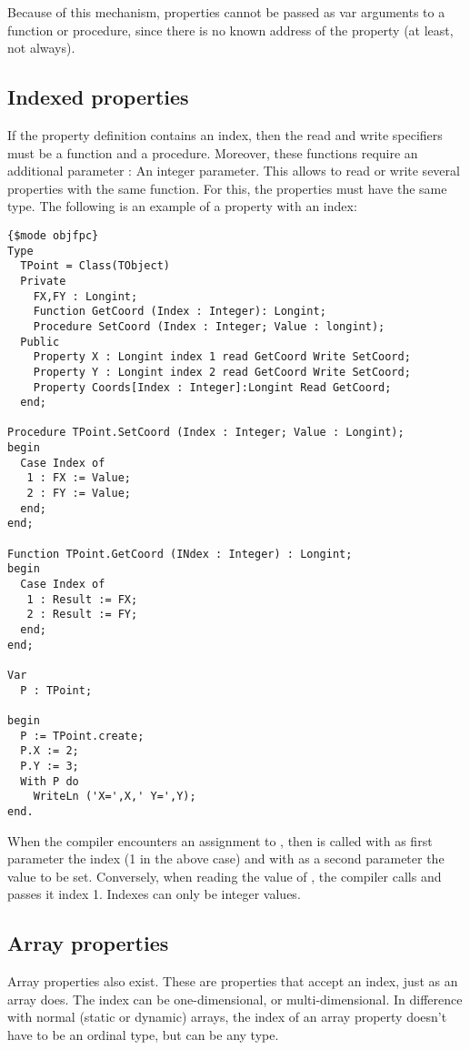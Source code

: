Because of this mechanism, properties cannot be passed as var arguments to a
function or procedure, since there is no known address of the property (at
least, not always).

\subsection{Indexed properties}
If the property definition contains an index,  then the read and write
specifiers must be a function and a procedure. Moreover, these functions
require an additional parameter : An integer parameter. This allows to read
or write several properties with the same function. For this, the properties
must have the same type.
The following is an example of a property with an index:
\begin{verbatim}
{$mode objfpc}
Type 
  TPoint = Class(TObject)
  Private
    FX,FY : Longint;
    Function GetCoord (Index : Integer): Longint;
    Procedure SetCoord (Index : Integer; Value : longint);
  Public
    Property X : Longint index 1 read GetCoord Write SetCoord;
    Property Y : Longint index 2 read GetCoord Write SetCoord;
    Property Coords[Index : Integer]:Longint Read GetCoord;
  end;

Procedure TPoint.SetCoord (Index : Integer; Value : Longint);
begin
  Case Index of
   1 : FX := Value;
   2 : FY := Value;
  end;
end;

Function TPoint.GetCoord (INdex : Integer) : Longint;
begin
  Case Index of
   1 : Result := FX;
   2 : Result := FY;
  end;
end;

Var 
  P : TPoint;

begin
  P := TPoint.create;
  P.X := 2;
  P.Y := 3;
  With P do
    WriteLn ('X=',X,' Y=',Y);
end.
\end{verbatim}
When the compiler encounters an assignment to , then 
is called with as first parameter the index (1 in the above case) and with
as a second parameter the value to be set.
Conversely, when reading the value of , the compiler calls
 and passes it index 1.
Indexes can only be integer values.

\subsection{Array properties}
Array properties also exist. These are properties that accept an
index, just as an array does. The index can be one-dimensional, or multi-dimensional.
In difference with normal (static or dynamic) arrays, the index of an array property 
doesn't have to be an ordinal type, but can be any type.


